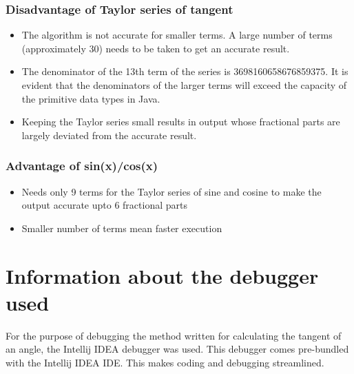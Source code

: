 \documentclass[paper=a4, fontsize=11pt,twoside]{scrartcl}	%
\begin{document}
    \subsubsection{Disadvantage of Taylor series of tangent}
    \begin{itemize}
        \item The algorithm is not accurate for smaller terms. A large number of terms (approximately 30) needs to be taken to get an accurate result.
        \item The denominator of the 13th term of the series is 3698160658676859375. It is evident that the denominators of the larger terms will exceed the capacity of the primitive data types in Java.
        \item Keeping the Taylor series small results in output whose fractional parts are largely deviated from the accurate result.
    \end{itemize}
    \subsubsection{Advantage of sin(x)/cos(x)}
    \begin{itemize}
        \item Needs only 9 terms for the Taylor series of sine and cosine to make the output accurate upto 6 fractional parts
        \item Smaller number of terms mean faster execution
    \end{itemize}
    
    \section{Information about the debugger used}
    For the purpose of debugging the method written for calculating the tangent of an angle, the Intellij IDEA debugger was used. This debugger comes pre-bundled with the Intellij IDEA IDE. This makes coding and debugging streamlined.
\end{document}
